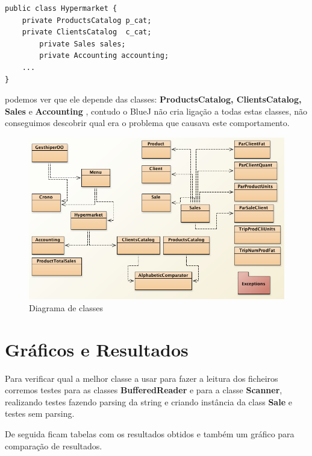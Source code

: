\documentclass[10pt] {article}
\begin{document}
\begin{lstlisting}
public class Hypermarket {
	private ProductsCatalog p_cat;
   	private ClientsCatalog  c_cat;
    	private Sales sales;
    	private Accounting accounting;
	...
}
\end{lstlisting}

\par podemos ver que ele depende das classes: \color{blue} \textbf{ProductsCatalog, ClientsCatalog, Sales} \color{black} e
\color{blue} \textbf{Accounting} \color{black}, contudo o BlueJ não cria ligação a todas estas classes, não conseguimos
descobrir qual era o problema que causava este comportamento.

\begin{figure}[ht!]
\centering
\includegraphics[width=150mm]{diagram.png}
\caption{Diagrama de classes}
\label{fig:sales}
\end{figure}

\newpage
\section{Gráficos e Resultados}

\par Para verificar qual a melhor classe a usar para fazer a leitura dos ficheiros corremos testes para as classes
\textbf{BufferedReader} e para a classe \textbf{Scanner}, realizando testes fazendo parsing da string e criando instância
da class \textbf{Sale} e testes sem parsing.
\par De seguida ficam tabelas com os resultados obtidos e também um gráfico para comparação de resultados.
\end{document}
